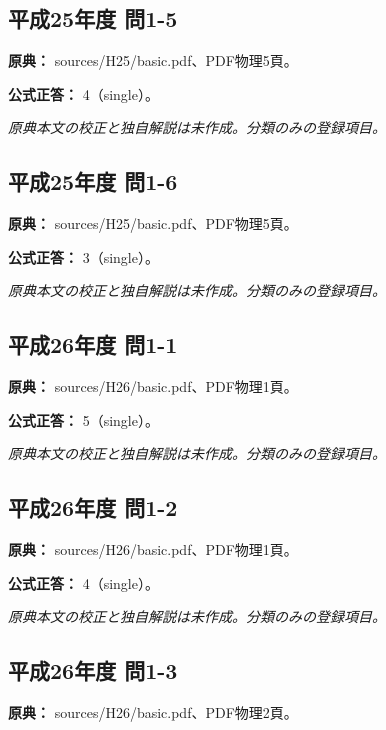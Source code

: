 \subsection{平成25年度 問1-5}
\label{q:h25-reg-basic-1-5}

\noindent\textbf{原典：} sources/H25/basic.pdf、PDF物理5頁。

\textbf{公式正答：} 4（single）。

\par\textit{原典本文の校正と独自解説は未作成。分類のみの登録項目。}

\subsection{平成25年度 問1-6}
\label{q:h25-reg-basic-1-6}

\noindent\textbf{原典：} sources/H25/basic.pdf、PDF物理5頁。

\textbf{公式正答：} 3（single）。

\par\textit{原典本文の校正と独自解説は未作成。分類のみの登録項目。}

\subsection{平成26年度 問1-1}
\label{q:h26-reg-basic-1-1}

\noindent\textbf{原典：} sources/H26/basic.pdf、PDF物理1頁。

\textbf{公式正答：} 5（single）。

\par\textit{原典本文の校正と独自解説は未作成。分類のみの登録項目。}

\subsection{平成26年度 問1-2}
\label{q:h26-reg-basic-1-2}

\noindent\textbf{原典：} sources/H26/basic.pdf、PDF物理1頁。

\textbf{公式正答：} 4（single）。

\par\textit{原典本文の校正と独自解説は未作成。分類のみの登録項目。}

\subsection{平成26年度 問1-3}
\label{q:h26-reg-basic-1-3}

\noindent\textbf{原典：} sources/H26/basic.pdf、PDF物理2頁。

